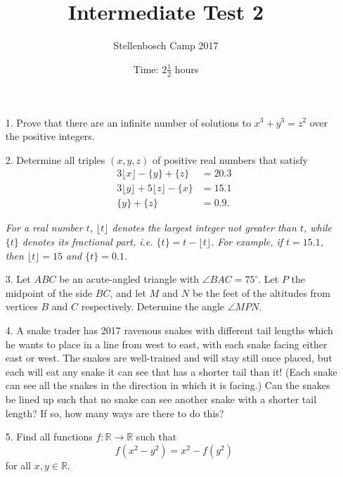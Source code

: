 \documentclass{article}
\title{Intermediate Test 2}
\author{Stellenbosch Camp 2017}
\date{Time: $2\frac{1}{2}$ hours}
\begin{document}
 \maketitle

\begin{enumerate}

\item[1.]  %
Prove that there are an infinite number of solutions to $x^3 + y^3 = z^2$ over the positive integers.

\item[2.] %
Determine all triples $(x,y,z)$ of positive real numbers that satisfy
\begin{align*}
	3\lfloor{x}\rfloor -\{y\} +\{z\} &= 20.3 \\
	3\lfloor{y}\rfloor +5\lfloor{z}\rfloor -\{x\} &= 15.1 \\
	\{y\} +\{z\} &= 0.9.
\end{align*}

\emph{For a real number $t$, $\lfloor{t}\rfloor$ denotes the largest integer not greater than $t$, while $\{t\}$ denotes its fractional part, i.e. $\{t\} = t -\lfloor{t}\rfloor$. For example, if $t = 15.1$, then $\lfloor{t}\rfloor = 15$ and $\{t\} = 0.1$.}

\item[3.] %
Let $ABC$ be an acute-angled triangle with $\angle BAC = 75^\circ$. Let $P$ the midpoint of the side $BC$, and let $M$ and $N$ be the feet of the altitudes from vertices $B$ and $C$ respectively. Determine the angle $\angle MPN$.

\item[4.] %
A snake trader has 2017 ravenous snakes with different tail lengths which he wants to place in a line from west to east, with each snake facing either east or west. The snakes are well-trained and will stay still once placed, but each will eat any snake it can see that has a shorter tail than it! (Each snake can see all the snakes in the direction in which it is facing.) Can the snakes be lined up such that no snake can see another snake with a shorter tail length? If so, how many ways are there to do this?

\item[5.]
Find all functions $f : \mathbb{R} \to \mathbb{R}$ such that
	\[f(x^2-y^2) = x^2 - f(y^2)\]
for all $x,y \in \mathbb{R}$.

\end{enumerate}
\end{document}
